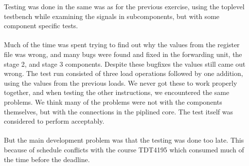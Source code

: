 Testing was done in the same was as for the previous exercise, using the
toplevel testbench while examining the signals in subcomponents, but with some
component specific tests.
\paragraph*{}
Much of the time was spent trying to find out why the values from the register
file was wrong, and many bugs were found and fixed in the forwarding unit, the
stage 2, and stage 3 components. Despite these bugfixes the values still came
out wrong. The test run consisted of three load operations followed by one
addition, using the values from the previous loads. We never got these to work
properly together, and when testing the other instructions, we encountered the
same problems. We think many of the problems were not with the components
themselves, but with the connections in the piplined core. The test itself was
considered to perform acceptably.
\paragraph*{}
But the main development problem was that the testing was done too late. This
because of schedule conflicts with the course TDT4195 which consumed much of the
time before the deadline.

